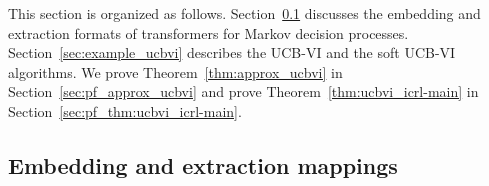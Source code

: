 \documentclass[10pt]{article}
\newcommand{\<}{\left\langle}
\renewcommand{\>}{\right\rangle}
\begin{document}
This section is organized as follows. Section~\ref{sec:tf_embed_mdp} discusses the embedding and extraction formats of transformers for Markov decision processes. Section~\ref{sec:example_ucbvi} describes the UCB-VI and the soft UCB-VI algorithms.  We prove Theorem~\ref{thm:approx_ucbvi} in Section~\ref{sec:pf_approx_ucbvi} and prove Theorem~\ref{thm:ucbvi_icrl-main} in Section~\ref{sec:pf_thm:ucbvi_icrl-main}. 
















\subsection{Embedding and extraction mappings}\label{sec:tf_embed_mdp}
\end{document}
